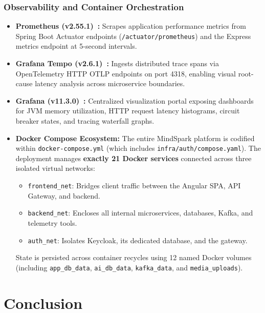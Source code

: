 \subsubsection{Observability and Container Orchestration}
\begin{itemize}[leftmargin=1.5em]
    \item \textbf{Prometheus (v2.55.1)~\cite{prometheus2026}:} Scrapes application performance metrics from Spring Boot Actuator endpoints (\texttt{/actuator/prometheus}) and the Express metrics endpoint at 5-second intervals.
    \item \textbf{Grafana Tempo (v2.6.1)~\cite{tempo2026}:} Ingests distributed trace spans via OpenTelemetry HTTP OTLP endpoints on port 4318, enabling visual root-cause latency analysis across microservice boundaries.
    \item \textbf{Grafana (v11.3.0)~\cite{grafana2026}:} Centralized visualization portal exposing dashboards for JVM memory utilization, HTTP request latency histograms, circuit breaker states, and tracing waterfall graphs.
    \item \textbf{Docker Compose Ecosystem:} The entire MindSpark platform is codified within \texttt{docker-compose.yml} (which includes \texttt{infra/auth/compose.yaml}). The deployment manages \textbf{exactly 21 Docker services} connected across three isolated virtual networks:
    \begin{itemize}[leftmargin=1.2em]
        \item \texttt{frontend\_net}: Bridges client traffic between the Angular SPA, API Gateway, and backend.
        \item \texttt{backend\_net}: Encloses all internal microservices, databases, Kafka, and telemetry tools.
        \item \texttt{auth\_net}: Isolates Keycloak, its dedicated database, and the gateway.
    \end{itemize}
    State is persisted across container recycles using 12 named Docker volumes (including \texttt{app\_db\_data}, \texttt{ai\_db\_data}, \texttt{kafka\_data}, and \texttt{media\_uploads}).
\end{itemize}


\section{Conclusion}
\label{sec:ch1_conclusion}

